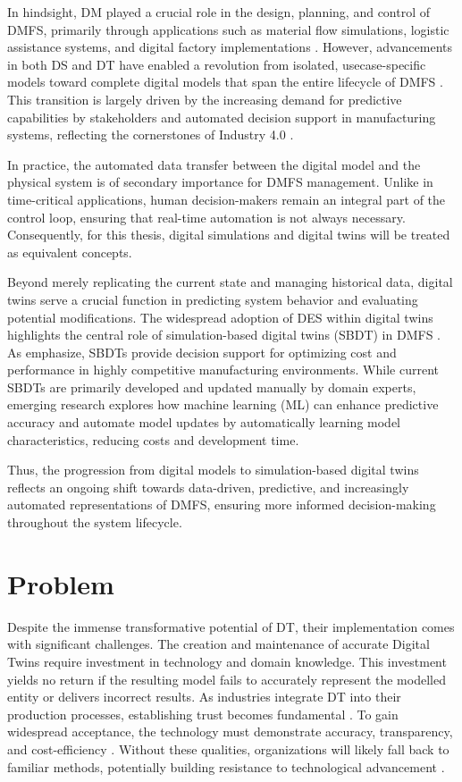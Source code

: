 In hindsight, DM played a crucial role in the design, planning, and control of DMFS, primarily through applications such as material flow simulations, logistic assistance systems, and digital factory implementations \parencite{Thiede2013}. However, advancements in both DS and DT have enabled a revolution from isolated, usecase-specific models toward complete digital models that span the entire lifecycle of DMFS \parencite{Abdoune2023}. This transition is largely driven by the increasing demand for predictive capabilities by stakeholders and automated decision support in manufacturing systems, reflecting the cornerstones of Industry 4.0 \parencite{frank2019industry}.

In practice, the automated data transfer between the digital model and the physical system is of secondary importance for DMFS management. Unlike in time-critical applications, human decision-makers remain an integral part of the control loop, ensuring that real-time automation is not always necessary. Consequently, for this thesis, digital simulations and digital twins will be treated as equivalent concepts.

Beyond merely replicating the current state and managing historical data, digital twins serve a crucial function in predicting system behavior and evaluating potential modifications. The widespread adoption of DES within digital twins highlights the central role of simulation-based digital twins (SBDT) in DMFS \parencite{Lugaresi2021aifac}. As \cite{schwede2024learning} emphasize, SBDTs provide decision support for optimizing cost and performance in highly competitive manufacturing environments. While current SBDTs are primarily developed and updated manually by domain experts, emerging research explores how machine learning (ML) can enhance predictive accuracy and automate model updates by automatically learning model characteristics, reducing costs and development time.

Thus, the progression from digital models to simulation-based digital twins reflects an ongoing shift towards data-driven, predictive, and increasingly automated representations of DMFS, ensuring more informed decision-making throughout the system lifecycle.

\section{Problem}
Despite the immense transformative potential of DT, their implementation comes with significant challenges. The creation and maintenance of accurate Digital Twins require investment in technology and domain knowledge. This investment yields no return if the resulting model fails to accurately represent the modelled entity or delivers incorrect results. As industries integrate DT into their production processes, establishing trust becomes fundamental \parencite{trauer2022digital,arrieta2020explainable}. To gain widespread acceptance, the technology must demonstrate accuracy, transparency, and cost-efficiency \parencite{Wright2020amse,Shao2023mfglet}. Without these qualities, organizations will likely fall back to familiar methods, potentially building resistance to technological advancement \parencite{lapointe2005multilevel}.

